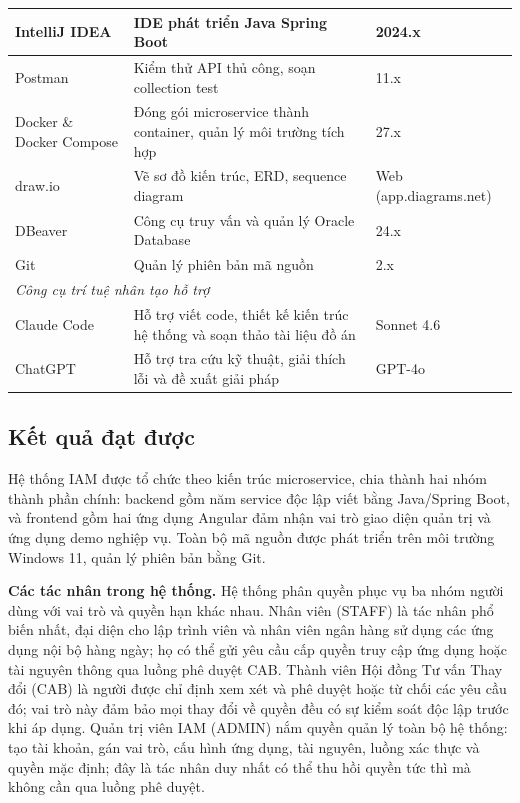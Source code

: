 \documentclass[../DoAn.tex]{subfiles}
\begin{document}
\begin{table}[H]
\begin{tabular}{|p{3.5cm}|p{7.0cm}|p{2.5cm}|}
IntelliJ IDEA & IDE phát triển Java Spring Boot & 2024.x \\ \hline
Postman & Kiểm thử API thủ công, soạn collection test & 11.x \\ \hline
Docker \& Docker Compose & Đóng gói microservice thành container, quản lý môi trường tích hợp & 27.x \\ \hline
draw.io & Vẽ sơ đồ kiến trúc, ERD, sequence diagram & Web (app.diagrams.net) \\ \hline
DBeaver & Công cụ truy vấn và quản lý Oracle Database & 24.x \\ \hline
Git & Quản lý phiên bản mã nguồn & 2.x \\ \hline
\multicolumn{3}{|l|}{\textit{Công cụ trí tuệ nhân tạo hỗ trợ}} \\ \hline
Claude Code & Hỗ trợ viết code, thiết kế kiến trúc hệ thống và soạn thảo tài liệu đồ án & Sonnet 4.6 \\ \hline
ChatGPT & Hỗ trợ tra cứu kỹ thuật, giải thích lỗi và đề xuất giải pháp & GPT-4o \\ \hline
\end{tabular}
\end{table}

\subsection{Kết quả đạt được}

Hệ thống IAM được tổ chức theo kiến trúc microservice, chia thành hai nhóm thành phần chính: backend gồm năm service độc lập viết bằng Java/Spring Boot, và frontend gồm hai ứng dụng Angular đảm nhận vai trò giao diện quản trị và ứng dụng demo nghiệp vụ. Toàn bộ mã nguồn được phát triển trên môi trường Windows 11, quản lý phiên bản bằng Git.

\textbf{Các tác nhân trong hệ thống.} Hệ thống phân quyền phục vụ ba nhóm người dùng với vai trò và quyền hạn khác nhau. Nhân viên (STAFF) là tác nhân phổ biến nhất, đại diện cho lập trình viên và nhân viên ngân hàng sử dụng các ứng dụng nội bộ hàng ngày; họ có thể gửi yêu cầu cấp quyền truy cập ứng dụng hoặc tài nguyên thông qua luồng phê duyệt CAB. Thành viên Hội đồng Tư vấn Thay đổi (CAB) là người được chỉ định xem xét và phê duyệt hoặc từ chối các yêu cầu đó; vai trò này đảm bảo mọi thay đổi về quyền đều có sự kiểm soát độc lập trước khi áp dụng. Quản trị viên IAM (ADMIN) nắm quyền quản lý toàn bộ hệ thống: tạo tài khoản, gán vai trò, cấu hình ứng dụng, tài nguyên, luồng xác thực và quyền mặc định; đây là tác nhân duy nhất có thể thu hồi quyền tức thì mà không cần qua luồng phê duyệt.
\end{document}
